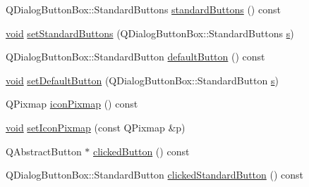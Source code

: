 \begin{DoxyCompactItemize}
\item 
\-Q\-Dialog\-Button\-Box\-::\-Standard\-Buttons \hyperlink{class_utils_1_1_checkable_message_box_a73d689c7d4852c19217ce3107ce1f66f}{standard\-Buttons} () const 
\item 
\hyperlink{group___u_a_v_objects_plugin_ga444cf2ff3f0ecbe028adce838d373f5c}{void} \hyperlink{class_utils_1_1_checkable_message_box_a3b0d5dff93907b3a77900b0754be2fbf}{set\-Standard\-Buttons} (\-Q\-Dialog\-Button\-Box\-::\-Standard\-Buttons \hyperlink{uavobjecttemplate_8m_a3691308f2a4c2f6983f2880d32e29c84}{s})
\item 
\-Q\-Dialog\-Button\-Box\-::\-Standard\-Button \hyperlink{class_utils_1_1_checkable_message_box_a1b70174fedfd329a275043a32afd56cc}{default\-Button} () const 
\item 
\hyperlink{group___u_a_v_objects_plugin_ga444cf2ff3f0ecbe028adce838d373f5c}{void} \hyperlink{class_utils_1_1_checkable_message_box_ad5b6b948af48813620a34c67026bd0ab}{set\-Default\-Button} (\-Q\-Dialog\-Button\-Box\-::\-Standard\-Button \hyperlink{uavobjecttemplate_8m_a3691308f2a4c2f6983f2880d32e29c84}{s})
\item 
\-Q\-Pixmap \hyperlink{class_utils_1_1_checkable_message_box_afa4f7d3a30eabc91df73788016604cd2}{icon\-Pixmap} () const 
\item 
\hyperlink{group___u_a_v_objects_plugin_ga444cf2ff3f0ecbe028adce838d373f5c}{void} \hyperlink{class_utils_1_1_checkable_message_box_a93343c79b51e90e9fdc244687f693286}{set\-Icon\-Pixmap} (const \-Q\-Pixmap \&p)
\item 
\-Q\-Abstract\-Button $\ast$ \hyperlink{class_utils_1_1_checkable_message_box_aed309ded98776c484412478579990aa4}{clicked\-Button} () const 
\item 
\-Q\-Dialog\-Button\-Box\-::\-Standard\-Button \hyperlink{class_utils_1_1_checkable_message_box_ad5ae85803dbcf70caf0a9a8fff6794b1}{clicked\-Standard\-Button} () const 
\end{DoxyCompactItemize}
